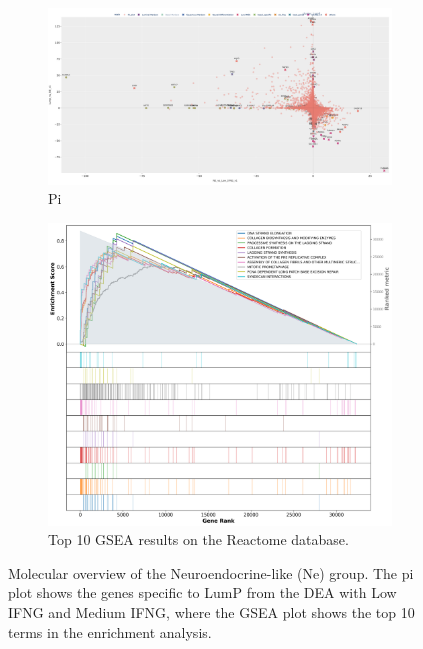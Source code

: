 \begin{figure}[!htb]
    \centering
    \begin{subfigure}[!t]{0.79\textwidth}
        \includegraphics[width=\textwidth,keepaspectratio]{Sections/ClusteringAnalysis/Resources/discussion/other_groups/ne_pi.png}    
        \caption{Pi}
        \label{fig:cs:ne_pi}
    \end{subfigure}
    \centering
    \begin{subfigure}[!t]{0.59\textwidth}
        \includegraphics[width=\textwidth, keepaspectratio]{Sections/ClusteringAnalysis/Resources/discussion/other_groups/ne2_reactome_10_top.png}
        \caption{Top 10 GSEA results on the Reactome database.}
        \label{fig:cs:ne_gsea}
    \end{subfigure} 
    \centering
    \caption{Molecular overview of the Neuroendocrine-like (Ne) group. The pi plot shows the genes specific to LumP from the DEA with Low IFNG and Medium IFNG, where the GSEA plot shows the top 10 terms in the enrichment analysis.} 
    \label{fig:cs:ne}
\end{figure}


